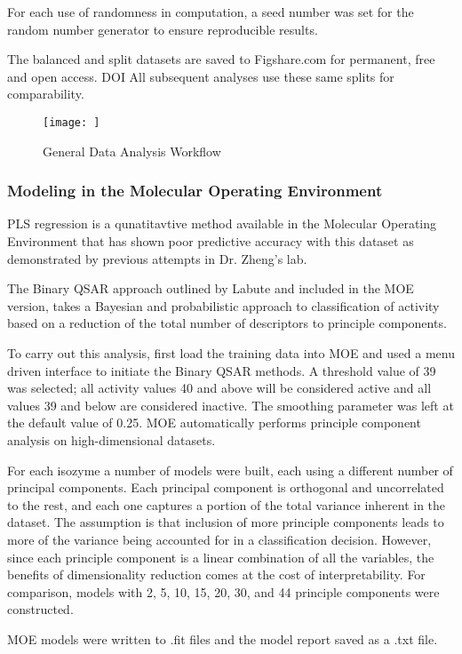 For each use of randomness in computation, a seed number was set for the random number generator to ensure reproducible results.  

The balanced and split datasets are saved to Figshare.com for permanent, free and open access. DOI All subsequent analyses use these same splits for comparability.


\begin{figure}[h,t]
  \caption{General Data Analysis Workflow}
  \centering
   \texttt{[image: ]}
\end{figure}

\subsubsection{Modeling in the Molecular Operating Environment}
PLS regression is a qunatitavtive method available in the Molecular Operating Environment that has shown poor predictive accuracy with this dataset as demonstrated by previous attempts in Dr. Zheng's lab.

The Binary QSAR approach outlined by Labute \cite{Labute2001} and included in the MOE version, takes a Bayesian and probabilistic approach to classification of activity based on a reduction of the total number of descriptors to principle components.

To carry out this analysis, first load the training data into MOE and used a menu driven interface to initiate the Binary QSAR methods. A threshold value of 39 was selected; all activity values 40 and above will be considered active and all values 39 and below are considered inactive. The smoothing parameter was left at the default value of 0.25. MOE automatically performs principle component analysis on high-dimensional datasets.

For each isozyme a number of models were built, each using a different number of principal components.  Each principal component is orthogonal and uncorrelated to the rest, and each one captures a portion of the total variance inherent in the dataset. The assumption is that inclusion of more principle components leads to more of the variance being accounted for in a classification decision. However, since each principle component is a linear combination of all the variables, the benefits of dimensionality reduction comes at the cost of interpretability.  For comparison, models with 2, 5, 10, 15, 20, 30, and 44 principle components were constructed. 

MOE models were written to .fit files and the model report saved as a .txt file.

